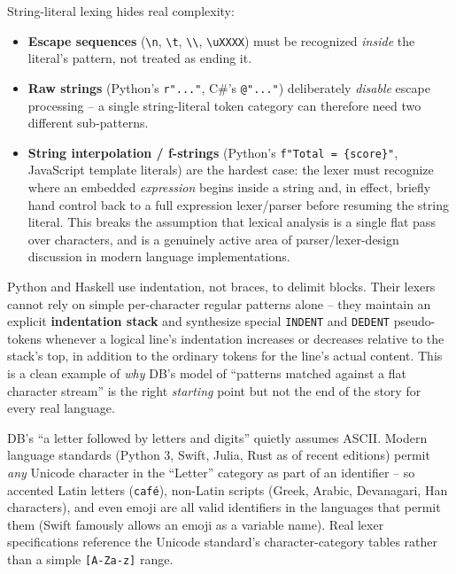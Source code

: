 \documentclass[full-course-notes.tex]{subfiles}
\begin{document}
\begin{enrichment}
String-literal lexing hides real complexity:
\begin{itemize}
  \item \textbf{Escape sequences} (\texttt{\textbackslash n}, \texttt{\textbackslash t},
  \texttt{\textbackslash\textbackslash}, \texttt{\textbackslash uXXXX}) must be recognized
  \emph{inside} the literal's pattern, not treated as ending it.
  \item \textbf{Raw strings} (Python's \texttt{r"..."}, C\#'s \texttt{@"..."}) deliberately
  \emph{disable} escape processing -- a single string-literal token category can therefore need
  two different sub-patterns.
  \item \textbf{String interpolation / f-strings} (Python's \texttt{f"Total = \{score\}"},
  JavaScript template literals) are the hardest case: the lexer must recognize where an embedded
  \emph{expression} begins inside a string and, in effect, briefly hand control back to a
  full expression lexer/parser before resuming the string literal. This breaks the assumption
  that lexical analysis is a single flat pass over characters, and is a genuinely active area of
  parser/lexer-design discussion in modern language implementations.
\end{itemize}
\end{enrichment}

\begin{enrichment}
Python and Haskell use indentation, not braces, to delimit blocks. Their lexers cannot rely on
simple per-character regular patterns alone -- they maintain an explicit \textbf{indentation
stack} and synthesize special \texttt{INDENT} and \texttt{DEDENT} pseudo-tokens whenever a
logical line's indentation increases or decreases relative to the stack's top, in addition to
the ordinary tokens for the line's actual content. This is a clean example of \emph{why} DB's
model of ``patterns matched against a flat character stream'' is the right \emph{starting}
point but not the end of the story for every real language.
\end{enrichment}

\begin{enrichment}
DB's ``a letter followed by letters and digits'' quietly assumes ASCII. Modern language
standards (Python 3, Swift, Julia, Rust as of recent editions) permit \emph{any} Unicode
character in the ``Letter'' category as part of an identifier -- so accented Latin letters
(\texttt{caf\'e}), non-Latin scripts (Greek, Arabic, Devanagari, Han characters), and even emoji
are all valid identifiers in the languages that permit them (Swift famously allows an emoji as a
variable name). Real lexer specifications reference the Unicode standard's character-category
tables rather than a simple \texttt{[A-Za-z]} range.
\end{enrichment}
\end{document}
